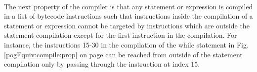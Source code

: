 \Qed\\


The next  property  of the compiler is that any statement or expression   is
 compiled in a list of bytecode instructions 
such that instructions inside the compilation of a statement or expression cannot be targeted by instructions 
 which are outside the statement compilation except for the first instruction in the compilation.
 For instance,  the instructions 15-30 in the compilation of the while statement
 in Fig. \ref{pogEquiv:compile:prop} on page \pageref{pogEquiv:compile:prop}
 can be reached from outside of the statement compilation only by passing through the instruction at index 15.

